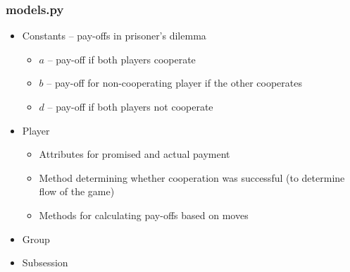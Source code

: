 \documentclass{beamer}
\begin{document}
 
\begin{frame}
\frametitle{models.py} 

\begin{itemize}
  \item Constants -- pay-offs in prisoner's dilemma
	\begin{itemize}
		\item $a$ -- pay-off if both players cooperate
		\item $b$ -- pay-off for non-cooperating player if the other cooperates
		\item $d$ -- pay-off if both players not cooperate
	\end{itemize}
	
  \item Player
	\begin{itemize}
	  \item Attributes for promised and actual payment
	  \item Method determining whether cooperation was successful (to determine flow of the game)
		\item Methods for calculating pay-offs based on moves
	\end{itemize}

  \item Group
	\item Subsession
\end{itemize}

\end{frame}
\end{document}
